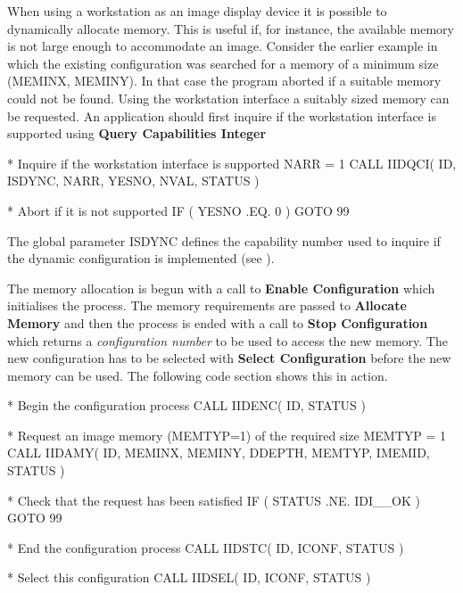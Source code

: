 \documentclass[11pt,nolof]{starlink}
\begin{document}
When using a workstation as an image display device it is possible to
dynamically allocate memory. This is useful if, for instance, the
available memory is not large enough to accommodate an image. Consider
the earlier example in which the existing configuration was searched
for a memory of a minimum size (MEMINX, MEMINY). In that case the
program aborted if a suitable memory could not be found. Using the
workstation interface a suitably sized memory can be requested. An
application should first inquire if the workstation interface is
supported using \textbf{Query Capabilities Integer}
\begin{small}
\begin{terminalv}
*   Inquire if the workstation interface is supported
      NARR = 1
      CALL IIDQCI( ID, ISDYNC, NARR, YESNO, NVAL, STATUS )

*   Abort if it is not supported
      IF ( YESNO .EQ. 0 ) GOTO 99
\end{terminalv}
\end{small}
The global parameter ISDYNC defines the capability number used to inquire
if the dynamic configuration is implemented (see
).

The memory allocation is begun with a call to \textbf{Enable Configuration}
which initialises the process. The memory requirements are passed to
\textbf{Allocate Memory} and then the process is ended with a call to
\textbf{Stop Configuration} which returns a \textit{configuration number} to
be used to access the new memory. The new configuration has to be
selected with \textbf{Select Configuration} before the new memory can
be used. The following code section shows this in action.
\begin{small}
\begin{terminalv}
*   Begin the configuration process
      CALL IIDENC( ID, STATUS )

*   Request an image memory (MEMTYP=1) of the required size
      MEMTYP = 1
      CALL IIDAMY( ID, MEMINX, MEMINY, DDEPTH, MEMTYP, IMEMID, STATUS )

*   Check that the request has been satisfied
      IF ( STATUS .NE. IDI__OK ) GOTO 99

*   End the configuration process
      CALL IIDSTC( ID, ICONF, STATUS )

*   Select this configuration
      CALL IIDSEL( ID, ICONF, STATUS )
\end{terminalv}
\end{small}
\end{document}
